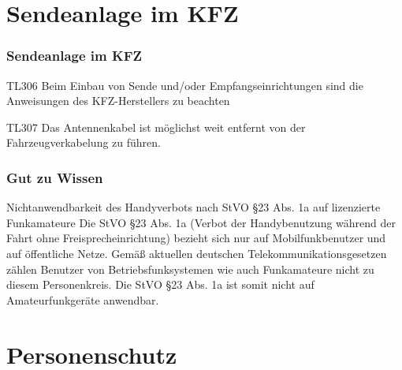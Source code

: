 \section*{Sendeanlage im KFZ}

\begin{frame}
  \frametitle{Sendeanlage im KFZ}
  \begin{center}
    \begin{exampleblock}{TL306}
      Beim Einbau von Sende und/oder Empfangseinrichtungen sind die Anweisungen des KFZ-Herstellers zu beachten
    \end{exampleblock}
    \begin{exampleblock}{TL307}
      Das Antennenkabel ist möglichst weit entfernt von der Fahrzeugverkabelung zu führen.
    \end{exampleblock}
  \end{center}
\end{frame}

\begin{frame}
  \frametitle{Gut zu Wissen}
  \begin{center}
    \begin{block}{Nichtanwendbarkeit des Handyverbots nach StVO §23 Abs. 1a auf lizenzierte Funkamateure}
      Die StVO §23 Abs. 1a (Verbot der Handybenutzung während der Fahrt ohne Freisprecheinrichtung) bezieht sich nur auf Mobilfunkbenutzer und auf öffentliche Netze. Gemäß aktuellen deutschen Telekommunikationsgesetzen zählen Benutzer von Betriebsfunksystemen wie auch Funkamateure nicht zu diesem Personenkreis. Die StVO §23 Abs. 1a ist somit nicht auf Amateurfunkgeräte anwendbar.
    \end{block}
  \end{center}
\end{frame}

\section*{Personenschutz}

